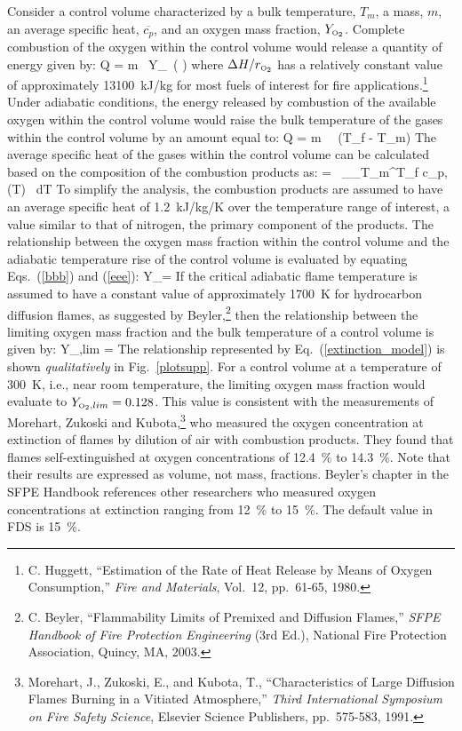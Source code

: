 \documentclass[11pt]{book}
\begin{document}
Consider a control volume characterized
by a bulk temperature, $T_m$, a mass, $m$, an average specific heat, $\overline{c_p}$, and an oxygen mass
fraction, $Y_{\tiny \hbox{O}_2}$.  Complete combustion of the oxygen within the control volume would release a
quantity of energy given by:
\be
   Q = m \, Y_\OTWO \, \left(   \right)  \label{bbb}
\ee
where $\Delta H/r_{\tiny \hbox{O}_2}$ has a relatively constant value of
approximately 13100~kJ/kg for most fuels of interest for fire applications.\footnote{C. Huggett, ``Estimation of the Rate of Heat Release by Means of Oxygen
Consumption,'' {\em Fire and Materials}, Vol.~12, pp.~61-65, 1980.}
Under adiabatic conditions, the energy released by combustion of the available oxygen within
the control volume would raise the bulk temperature of the gases within the control volume by an
amount equal to:
\be
   Q = m \,  \, (T_f - T_m)  \label{eee}
\ee
The average specific heat of the gases within the control volume can be calculated based on the
composition of the combustion products as:
\be
    =  \, \sum_\alpha \int_{T_m}^{T_f} c_{p,\alpha} (T) \, dT
\ee
To simplify the analysis, the combustion products are assumed to have an average specific heat
of 1.2~kJ/kg/K over the temperature range of interest, a value similar to that of nitrogen, the primary
component of the products.
The relationship between the oxygen mass fraction within the control volume and the adiabatic
temperature rise of the control volume is evaluated by equating Eqs.~(\ref{bbb}) and (\ref{eee}):
\be
   Y_\OTWO = 
\ee
If the critical adiabatic flame temperature is assumed to have a constant value of approximately
1700~K for hydrocarbon diffusion flames, as suggested by Beyler,\footnote{C. Beyler, ``Flammability Limits of Premixed and Diffusion Flames,''
{\em SFPE Handbook of Fire Protection Engineering} (3rd Ed.), National Fire
Protection Association, Quincy, MA, 2003.} then the relationship
between the limiting oxygen mass fraction and the bulk temperature of a control volume is given
by:
\be
   Y_{\OTWO,lim} =  \approx  {}  \label{extinction_model}
\ee
The relationship represented by Eq.~(\ref{extinction_model}) is shown {\em qualitatively} in Fig.~\ref{plotsupp}.
For a control volume at a temperature of 300~K, i.e., near room temperature, the limiting oxygen
mass fraction would evaluate to $Y_{{\tiny \hbox{O}_2},lim}=0.128$.  This value is consistent with the measurements
of Morehart, Zukoski and Kubota,\footnote{Morehart, J., Zukoski, E., and Kubota, T., ``Characteristics of Large Diffusion Flames
Burning in a Vitiated Atmosphere,'' {\em Third International Symposium on Fire Safety
Science}, Elsevier Science Publishers, pp.~575-583, 1991.} who measured the oxygen concentration at extinction of flames by dilution of air
with combustion products. They found that flames self-extinguished at oxygen concentrations of 12.4~\% to 14.3~\%. Note that their results
are expressed as volume, not mass, fractions. Beyler's chapter in the SFPE Handbook references other researchers who measured oxygen
concentrations at extinction ranging from 12~\% to 15~\%. The default value in FDS is 15~\%.
\end{document}
